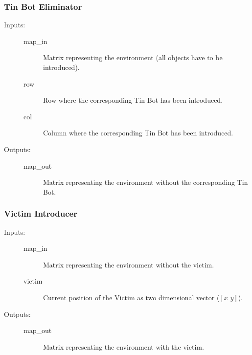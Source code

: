 \documentclass[a4paper,parskip,headheight=38pt]{scrartcl} %
\begin{document}
\subsubsection{Tin Bot Eliminator}
\begin{description}
\item[Inputs:] \hfill
	\begin{description}
	\item[map\_in] Matrix representing the environment (all objects have to be introduced).
	\item[row] Row where the corresponding Tin Bot has been introduced.
	\item[col] Column where the corresponding Tin Bot has been introduced.
	\end{description}
\item[Outputs:] \hfill
	\begin{description}
	\item[map\_out] Matrix representing the environment without the corresponding Tin Bot.
	\end{description}
\end{description}

\subsubsection{Victim Introducer}
\begin{description}
\item[Inputs:] \hfill
	\begin{description}
	\item[map\_in] Matrix representing the environment without the victim.
	\item[victim] Current position of the Victim as two dimensional vector ($[x\,\, y]$). 
	\end{description}
\item[Outputs:] \hfill
	\begin{description}
	\item[map\_out] Matrix representing the environment with the victim.
	\end{description}
\end{description}
\end{document}
